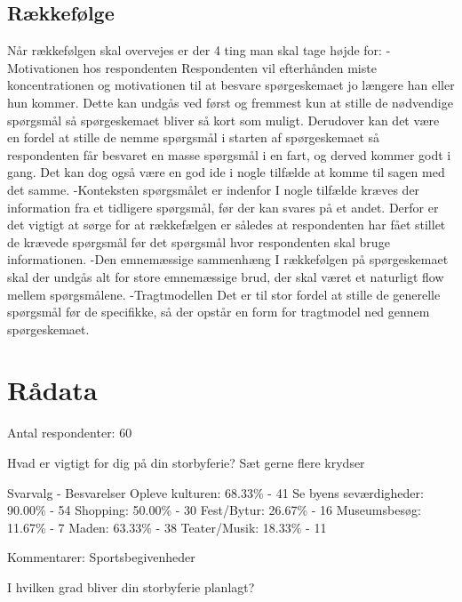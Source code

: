\subsection{Rækkefølge}
Når rækkefølgen skal overvejes er der 4 ting man skal tage højde for: 
-Motivationen hos respondenten
Respondenten vil efterhånden miste koncentrationen og motivationen til at besvare spørgeskemaet jo længere han eller hun kommer. Dette kan undgås ved først og fremmest kun at stille de nødvendige spørgsmål så spørgeskemaet bliver så kort som muligt. Derudover kan det være en fordel at stille de nemme spørgsmål i starten af spørgeskemaet så respondenten får besvaret en masse spørgsmål i en fart, og derved kommer godt i gang. Det kan dog også være en god ide i nogle tilfælde at komme til sagen med det samme.
-Konteksten spørgsmålet er indenfor 
I nogle tilfælde kræves der information fra et tidligere spørgsmål, før der kan svares på et andet. Derfor er det vigtigt at sørge for at rækkefælgen er således at respondenten har fået stillet de krævede spørgsmål før det spørgsmål hvor respondenten skal bruge informationen.
-Den emnemæssige sammenhæng 
I rækkefølgen på spørgeskemaet skal der undgås alt for store emnemæssige brud, der skal været et naturligt flow mellem spørgsmålene.
-Tragtmodellen
Det er til stor fordel at stille de generelle spørgsmål før de specifikke, så der opstår en form for tragtmodel ned gennem spørgeskemaet.


\section{Rådata}
Antal respondenter: 60

Hvad er vigtigt for dig på din storbyferie?
Sæt gerne flere krydser

Svarvalg - Besvarelser \newline
Opleve kulturen:
68.33\%  -  41 \newline
Se byens seværdigheder:
90.00\%  -  54 \newline
Shopping:
50.00\%  -  30 \newline
Fest/Bytur:
26.67\%  -  16 \newline
Museumsbesøg:
11.67\%  -   7 \newline
Maden:
63.33\%  -  38 \newline
Teater/Musik: 
18.33\%  -  11 \newline

Kommentarer:
Sportsbegivenheder

I hvilken grad bliver din storbyferie planlagt?

